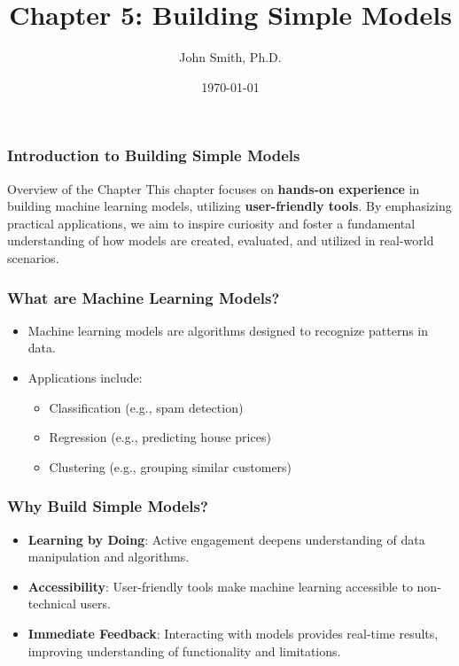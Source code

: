 \documentclass[aspectratio=169]{beamer}
\title[Building Simple Models]{Chapter 5: Building Simple Models}
\author[J. Smith]{John Smith, Ph.D.}
\institute[University Name]{
  Department of Computer Science\\
  University Name\\
  \vspace{0.3cm}
  Email: email@university.edu\\
  Website: www.university.edu
}
\date{\today}
\begin{document}
\frame{\titlepage}

\begin{frame}[fragile]
    \frametitle{Introduction to Building Simple Models}
    \begin{block}{Overview of the Chapter}
        This chapter focuses on \textbf{hands-on experience} in building machine learning models, utilizing \textbf{user-friendly tools}. By emphasizing practical applications, we aim to inspire curiosity and foster a fundamental understanding of how models are created, evaluated, and utilized in real-world scenarios.
    \end{block}
\end{frame}

\begin{frame}[fragile]
    \frametitle{What are Machine Learning Models?}
    \begin{itemize}
        \item Machine learning models are algorithms designed to recognize patterns in data.
        \item Applications include:
            \begin{itemize}
                \item Classification (e.g., spam detection)
                \item Regression (e.g., predicting house prices)
                \item Clustering (e.g., grouping similar customers)
            \end{itemize}
    \end{itemize}
\end{frame}

\begin{frame}[fragile]
    \frametitle{Why Build Simple Models?}
    \begin{itemize}
        \item \textbf{Learning by Doing}: Active engagement deepens understanding of data manipulation and algorithms.
        \item \textbf{Accessibility}: User-friendly tools make machine learning accessible to non-technical users.
        \item \textbf{Immediate Feedback}: Interacting with models provides real-time results, improving understanding of functionality and limitations.
    \end{itemize}
\end{frame}
\end{document}
